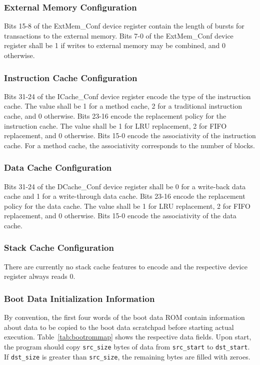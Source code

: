 \documentclass[a4paper,fontsize=10pt,twoside,DIV15,BCOR12mm,headinclude=true,footinclude=false,pagesize,bibtotoc]{scrbook}
\newcommand{\code}[1]{{\texttt{#1}}}
\begin{document}
\subsubsection{External Memory Configuration}

Bits 15-8 of the ExtMem\_Conf device register contain the length of
bursts for transactions to the external memory. Bits 7-0 of the
ExtMem\_Conf device register shall be 1 if writes to external memory
may be combined, and 0 otherwise.

\subsubsection{Instruction Cache Configuration}

Bits 31-24 of the ICache\_Conf device register encode the type of the
instruction cache. The value shall be 1 for a method cache, 2 for a
traditional instruction cache, and 0 otherwise. Bits 23-16 encode the
replacement policy for the instruction cache. The value shall be 1 for
LRU replacement, 2 for FIFO replacement, and 0 otherwise. Bits 15-0
encode the associativity of the instruction cache. For a method cache,
the associativity corresponds to the number of blocks.

\subsubsection{Data Cache Configuration}

Bits 31-24 of the DCache\_Conf device register shall be 0 for a
write-back data cache and 1 for a write-through data cache. Bits 23-16
encode the replacement policy for the data cache. The value shall be 1
for LRU replacement, 2 for FIFO replacement, and 0 otherwise. Bits
15-0 encode the associativity of the data cache.

\subsubsection{Stack Cache Configuration}

There are currently no stack cache features to encode and the
respective device register always reads 0.

\subsubsection{Boot Data Initialization Information}

By convention, the first four words of the boot data ROM contain
information about data to be copied to the boot data scratchpad before
starting actual execution. Table~\ref{tab:bootrommap} shows the
respective data fields. Upon start, the program should copy
\code{src\_size} bytes of data from \code{src\_start} to
\code{dst\_start}. If \code{dst\_size} is greater than
\code{src\_size}, the remaining bytes are filled with zeroes.
\end{document}

